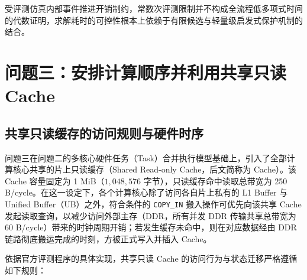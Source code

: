 \documentclass[anonymous,withtoc]{gmcm2026}
\begin{document}
受评测仿真内部事件推进开销制约，常数次评测限制并不构成全流程低多项式时间的代数证明，求解耗时的可控性根本上依赖于有限候选与轻量级启发式保护机制的结合。


\section{问题三：安排计算顺序并利用共享只读Cache}

\subsection{共享只读缓存的访问规则与硬件时序}

问题三在问题二的多核心硬件任务（Task）合并执行模型基础上，引入了全部计算核心共享的片上只读缓存（Shared Read-only Cache，后文简称为 Cache）。该 Cache 容量固定为 1 MiB（\(1{,}048{,}576\) 字节），只读缓存命中读取总带宽为 250 B/cycle。在这一设定下，各个计算核心除了访问各自片上私有的 L1 Buffer 与 Unified Buffer（UB）之外，符合条件的 \texttt{COPY\_IN} 搬入操作可优先向该共享 Cache 发起读取查询，以减少访问外部主存（DDR，所有并发 DDR 传输共享总带宽为 60 B/cycle）带来的时钟周期开销；若发生缓存未命中，则在对应数据经由 DDR 链路彻底搬运完成的时刻，方被正式写入并插入 Cache。

依据官方评测程序的具体实现，共享只读 Cache 的访问行为与状态迁移严格遵循如下规则：
\end{document}

